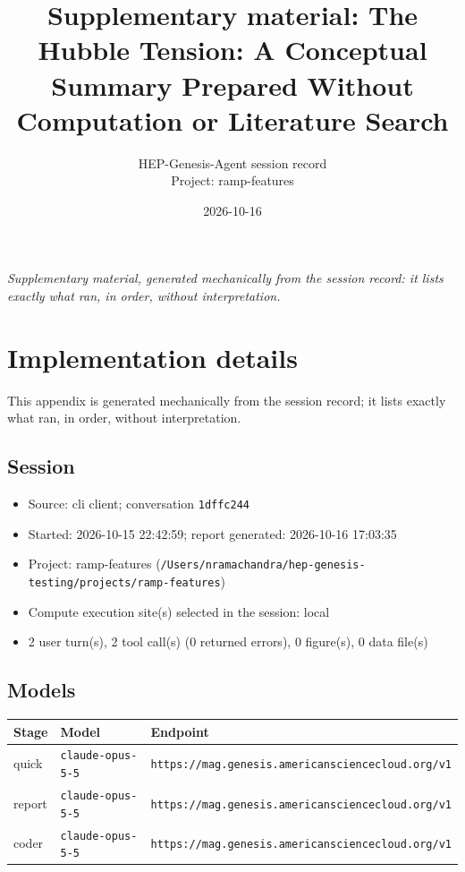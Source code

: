 \documentclass[11pt,a4paper]{article}
\title{Supplementary material: The Hubble Tension: A Conceptual Summary Prepared Without Computation or Literature Search}
\author{HEP-Genesis-Agent session record \\ \small Project: ramp-features}
\date{2026-10-16}
\begin{document}
\maketitle
\noindent\textit{\small Supplementary material, generated mechanically from the session record: it lists exactly what ran, in order, without interpretation.}
\vspace{1em}



\appendix
\section{Implementation details}
\label{app:impl}
This appendix is generated mechanically from the session record; it lists exactly what ran, in order, without interpretation.
\subsection{Session}
\begin{itemize}
  \item Source: cli client; conversation \texttt{1dffc244}
  \item Started: 2026-10-15 22:42:59; report generated: 2026-10-16 17:03:35
  \item Project: ramp-features (\texttt{/\allowbreak{}Users/\allowbreak{}nramachandra/\allowbreak{}hep-genesis-testing/\allowbreak{}projects/\allowbreak{}ramp-features})
  \item Compute execution site(s) selected in the session: local
  \item 2 user turn(s), 2 tool call(s) (0 returned errors), 0 figure(s), 0 data file(s)
\end{itemize}
\subsection{Models}
\begin{longtable}{@{}p{}p{}p{}@{}}
\toprule Stage & Model & Endpoint \\ \midrule \endhead
quick & \texttt{claude-opus-5-5} & \texttt{https:\allowbreak{}/\allowbreak{}/\allowbreak{}mag.genesis.americansciencecloud.org/\allowbreak{}v1} \\
report & \texttt{claude-opus-5-5} & \texttt{https:\allowbreak{}/\allowbreak{}/\allowbreak{}mag.genesis.americansciencecloud.org/\allowbreak{}v1} \\
coder & \texttt{claude-opus-5-5} & \texttt{https:\allowbreak{}/\allowbreak{}/\allowbreak{}mag.genesis.americansciencecloud.org/\allowbreak{}v1} \\
\bottomrule\end{longtable}
\end{document}
